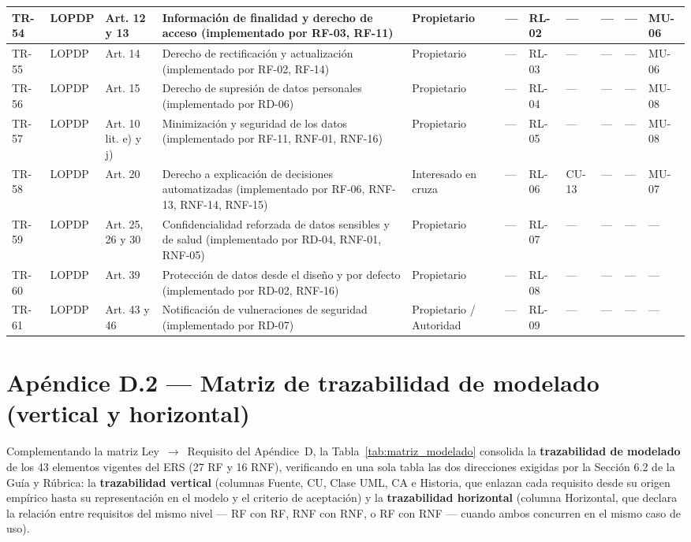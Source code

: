 \documentclass[journal,onecolumn]{IEEEtran}
\begin{document}
\begin{landscape}
\begin{longtable}{@{}p{0.8cm} p{1.3cm} p{1.5cm} p{2.2cm} p{1.5cm} p{1.8cm} p{1.6cm} p{1.3cm} p{1.3cm} p{1.3cm} p{1.5cm}@{}}
			TR-54 & LOPDP & Art. 12 y 13 & Información de finalidad y derecho de acceso (implementado por RF-03, RF-11) & Propietario & --- & RL-02 & --- & --- & --- & MU-06 \\ \midrule
			TR-55 & LOPDP & Art. 14 & Derecho de rectificación y actualización (implementado por RF-02, RF-14) & Propietario & --- & RL-03 & --- & --- & --- & MU-06 \\ \midrule
			TR-56 & LOPDP & Art. 15 & Derecho de supresión de datos personales (implementado por RD-06) & Propietario & --- & RL-04 & --- & --- & --- & MU-08 \\ \midrule
			TR-57 & LOPDP & Art. 10 lit. e) y j) & Minimización y seguridad de los datos (implementado por RF-11, RNF-01, RNF-16) & Propietario & --- & RL-05 & --- & --- & --- & MU-08 \\ \midrule
			TR-58 & LOPDP & Art. 20 & Derecho a explicación de decisiones automatizadas (implementado por RF-06, RNF-13, RNF-14, RNF-15) & Interesado en cruza & --- & RL-06 & CU-13 & --- & --- & MU-07 \\ \midrule
			TR-59 & LOPDP & Art. 25, 26 y 30 & Confidencialidad reforzada de datos sensibles y de salud (implementado por RD-04, RNF-01, RNF-05) & Propietario & --- & RL-07 & --- & --- & --- & --- \\ \midrule
			TR-60 & LOPDP & Art. 39 & Protección de datos desde el diseño y por defecto (implementado por RD-02, RNF-16) & Propietario & --- & RL-08 & --- & --- & --- & --- \\ \midrule
			TR-61 & LOPDP & Art. 43 y 46 & Notificación de vulneraciones de seguridad (implementado por RD-07) & Propietario / Autoridad & --- & RL-09 & --- & --- & --- & --- \\
			
		\end{longtable}
	\end{landscape}
	

\section*{Apéndice D.2 --- Matriz de trazabilidad de modelado (vertical y horizontal)}
\label{ap:trazabilidad-modelado}

Complementando la matriz Ley~$\rightarrow$~Requisito del Apéndice~D, la
Tabla~\ref{tab:matriz_modelado} consolida la \textbf{trazabilidad de
modelado} de los 43 elementos vigentes del ERS (27 RF y 16 RNF), verificando
en una sola tabla las dos direcciones exigidas por la Sección 6.2 de la Guía
y Rúbrica: la \textbf{trazabilidad vertical} (columnas Fuente, CU, Clase UML,
CA e Historia, que enlazan cada requisito desde su origen empírico hasta su
representación en el modelo y el criterio de aceptación) y la
\textbf{trazabilidad horizontal} (columna Horizontal, que declara la
relación entre requisitos del mismo nivel --- RF con RF, RNF con RNF, o RF
con RNF --- cuando ambos concurren en el mismo caso de uso).
\end{document}
